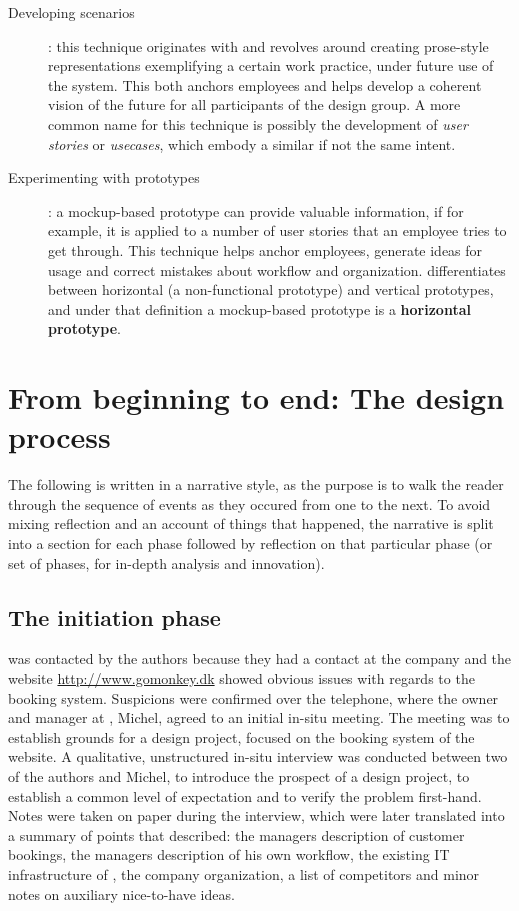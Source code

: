 \begin{description}
    \item [Developing scenarios]: this technique originates with \cite{clausen1993narratives} and revolves around creating
        prose-style representations exemplifying a certain work practice, under future use of the system. This both anchors employees
        and helps develop a coherent vision of the future for all participants of the design group. A more common name for this technique
        is possibly the development of \textit{user stories} or \textit{usecases}, which embody a similar if not the same intent.

    \item [Experimenting with prototypes]: a mockup-based prototype can provide
        valuable information, if for example, it is applied to a number of user
        stories that an employee tries to get through. This technique helps
        anchor employees, generate ideas for usage and correct mistakes about
        workflow and organization. \cite{bodker2004participatory} differentiates
        between horizontal (a non-functional prototype) and vertical prototypes,
        and under that definition a mockup-based prototype is a
        \textbf{horizontal prototype}.
\end{description}

\section{From beginning to end: The design process} \label{sec:process}
The following is written in a narrative style, as the purpose is to
walk the reader through the sequence of events as they occured from one
to the next. To avoid mixing reflection and an account of things that happened,
the narrative is split into a section for each phase followed by reflection on
that particular phase (or set of phases, for in-depth analysis and innovation).

\subsection{The initiation phase}
\gomonkey{} was contacted by the authors because they had a contact at the
company and the website \url{http://www.gomonkey.dk} showed obvious issues with
regards to the booking system. Suspicions were confirmed over the telephone,
where the owner and manager at \gomonkey{}, Michel, agreed to an initial in-situ
meeting. The meeting was to establish grounds for a design project, focused on
the booking system of the \gomonkey{} website. A qualitative, unstructured
in-situ interview was conducted between two of the authors and Michel, to
introduce the prospect of a design project, to establish a common level of
expectation and to verify the problem first-hand. Notes were taken on paper
during the interview, which were later translated into a summary of points that
described: the managers description of customer bookings, the managers
description of his own workflow, the existing IT infrastructure of \gomonkey{},
the company organization, a list of competitors and minor notes on auxiliary
nice-to-have ideas.

